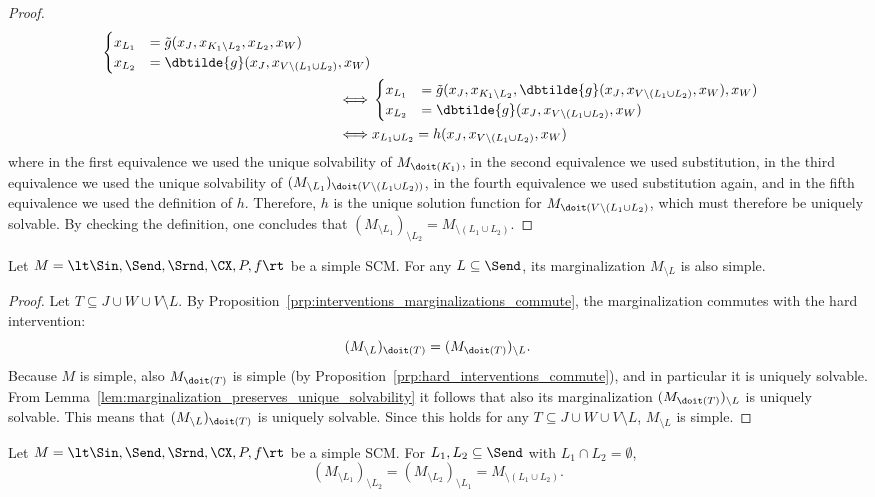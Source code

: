 \begin{proof}
\begin{equation*}
\begin{split}
\begin{cases}
      x_{L_1} &= \tilde{g}(x_J,x_{K_1\setminus L_2},x_{L_2},x_W) \\
      x_{L_2} &= \dbtilde{g}(x_J,x_{V\setminus(L_1 \cup L_2)},x_W)
    \end{cases} \\
    \iff &
    \begin{cases}
      x_{L_1} &= \tilde{g}(x_J,x_{K_1\setminus L_2},\dbtilde{g}(x_J,x_{V\setminus(L_1 \cup L_2)},x_W),x_W) \\
      x_{L_2} &= \dbtilde{g}(x_J,x_{V\setminus(L_1 \cup L_2)},x_W)
    \end{cases} \\
    \iff &
      x_{L_1\cup L_2} = h(x_J,x_{V\setminus(L_1\cup L_2)},x_W) 
  \end{split}\end{equation*}
  where in the first equivalence we used the unique solvability of $M_{\doit(K_1)}$, in the second
  equivalence we used substitution, in the third equivalence we used the unique solvability of
  $(M_{\setminus L_1})_{\doit(V\setminus (L_1\cup L_2))}$, in the fourth equivalence we used
  substitution again, and in the fifth equivalence we used the definition of $h$.
  Therefore, $h$ is the unique solution function for $M_{\doit(V\setminus(L_1\cup L_2)}$, which must therefore
  be uniquely solvable. By checking the definition, one concludes that $(M_{\setminus L_1})_{\setminus L_2} = M_{\setminus(L_1 \cup L_2)}$.
\end{proof}
\begin{Prp}\label{prp:marginalization_preserves_simplicity}
  Let $M = \lt \Sin, \Send, \Srnd, \CX, P, f \rt$ be a simple SCM. For any $L \subseteq \Send$, 
  its marginalization $M_{\setminus L}$ is also simple.
\end{Prp}
\begin{proof}
  Let $T \subseteq J \cup W \cup V \setminus L$. 
  By Proposition~\ref{prp:interventions_marginalizations_commute}, 
  the marginalization commutes with the hard intervention:
  $$(M_{\setminus L})_{\doit(T)} = (M_{\doit(T)})_{\setminus L}.$$
  Because $M$ is simple, also $M_{\doit(T)}$ is simple (by Proposition~\ref{prp:hard_interventions_commute}), 
  and in particular it is
  uniquely solvable. From Lemma~\ref{lem:marginalization_preserves_unique_solvability} it follows that also
  its marginalization $(M_{\doit(T)})_{\setminus L}$ is uniquely solvable. 
  This means that $(M_{\setminus L})_{\doit(T)}$ is uniquely solvable. Since this
  holds for any $T \subseteq J \cup W \cup V \setminus L$, $M_{\setminus L}$ is simple.
\end{proof}
\begin{Cor}
  Let $M = \lt \Sin, \Send, \Srnd, \CX, P, f \rt$ be a simple SCM.
  For $L_1, L_2 \subseteq \Send$ with $L_1 \cap L_2 = \emptyset$,
    $$(M_{\setminus L_1})_{\setminus L_2} = (M_{\setminus L_2})_{\setminus L_1} = M_{\setminus (L_1 \cup L_2)}.$$
\end{Cor}

